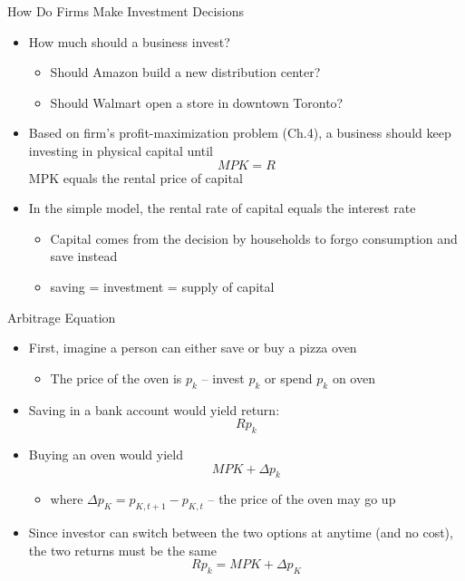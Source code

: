 \documentclass[aspectratio=1610]{beamer}
\begin{document}
\begin{frame}[wide]{How Do Firms Make Investment Decisions}
	\begin{itemize}
		\item How much should a business invest?
		\begin{itemize}
			\item Should Amazon build a new distribution center? 
			\item Should Walmart open a store in downtown Toronto? 
		\end{itemize}
		\vspace{2mm}
		\item Based on firm's profit-maximization problem (Ch.4), a business should keep investing in physical capital until 
		\[MPK = R\]
		MPK equals the rental price of capital
		\vspace{2mm}
		\item In the simple model, the rental rate of capital equals the interest rate
		\begin{itemize}
			\item Capital comes from the decision by households to forgo consumption and save instead
			\item saving = investment = supply of capital
			
		\end{itemize}
	\end{itemize}
\end{frame}

\begin{frame}[wide]{Arbitrage Equation}
	\begin{itemize}
		\item First, imagine a person can either save or buy a pizza oven
		\begin{itemize}
			\item The price of the oven is $p_k$ -- invest $p_k$ or spend $p_k$ on oven
		\end{itemize}
		\item Saving in a bank account would yield return:
		\[Rp_k\]
		\item Buying an oven would yield
		\[MPK + \Delta p_k\]
		\begin{itemize}
			\item[] where $\Delta p_K = p_{K,t+1} - p_{K,t}$ -- the price of the oven may go up
		\end{itemize}
		\item Since investor can switch between the two options at anytime (and no cost), the two returns must be the same
		\[R p_k = MPK + \Delta p_K\]
	\end{itemize}
\end{frame}
\end{document}
